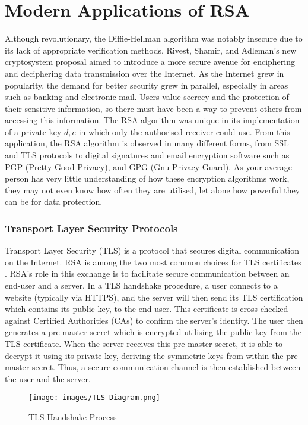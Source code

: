 \documentclass{article}
\begin{document}
\section{Modern Applications of RSA}
Although revolutionary, the Diffie-Hellman algorithm was notably insecure due to its lack of appropriate verification methods. Rivest, Shamir, and Adleman's new cryptosystem proposal aimed to introduce a more secure avenue for enciphering and deciphering data transmission over the Internet. As the Internet grew in popularity, the demand for better security grew in parallel, especially in areas such as banking and electronic mail. Users value secrecy and the protection of their sensitive information, so there must have been a way to prevent others from accessing this information. The RSA algorithm was unique in its implementation of a private key {$d, e$} in which only the authorised receiver could use. From this application, the RSA algorithm is observed in many different forms, from SSL and TLS protocols to digital signatures and email encryption software such as PGP (Pretty Good Privacy), and GPG (Gnu Privacy Guard). As your average person has very little understanding of how these encryption algorithms work, they may not even know how often they are utilised, let alone how powerful they can be for data protection. 

\subsubsection{Transport Layer Security Protocols}
Transport Layer Security (TLS) is a protocol that secures digital communication on the Internet. RSA is among the two most common choices for TLS certificates \cite{ssl}. RSA's role in this exchange is to facilitate secure communication between an end-user and a server. In a TLS handshake procedure, a user connects to a website (typically via HTTPS), and the server will then send its TLS certification which contains its public key, to the end-user. This certificate is cross-checked against Certified Authorities (CAs) to confirm the server's identity. The user then generates a pre-master secret which is encrypted utilising the public key from the TLS certificate. When the server receives this pre-master secret, it is able to decrypt it using its private key, deriving the symmetric keys from within the pre-master secret. Thus, a secure communication channel is then established between the user and the server.

\begin{figure}[ht]
    \centering
    \texttt{[image: images/TLS Diagram.png]}
    \caption{TLS Handshake Process}
\end{figure}
\end{document}

